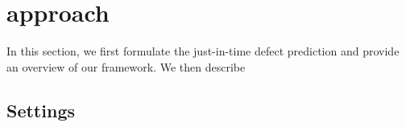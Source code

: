 \section{approach}
\label{sec:approach}
In this section, we first formulate the just-in-time defect prediction and provide an overview of our framework. We then describe 
\subsection{Settings}

